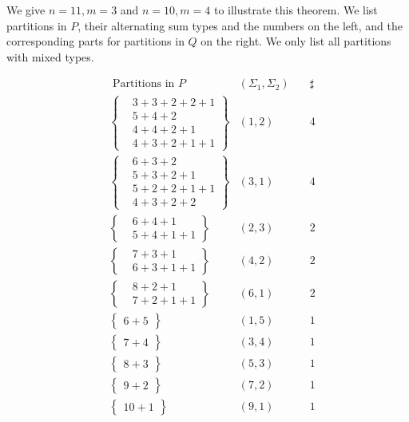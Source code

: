 \documentclass[11pt]{article}
\newtheorem{example}{\it Example\/}
\begin{document}
We give $n=11, m=3$ and $n=10, m=4$ to illustrate this theorem. 
We list partitions in $P$, their alternating sum types and the numbers on the left, and the corresponding parts for partitions in $Q$ on the right. We only list all partitions with mixed types.

\begin{minipage}{0.38\textwidth}
\small
\begin{align*}
& \mbox{ Partitions in $P$} &(\Sigma_{1}, \Sigma_{2})&\quad\sharp \\
&\left\{
\begin{array}{llll}
&3+3+2+2+1\\
&5+4+2\\
&4+4+2+1\\
&4+3+2+1+1
\end{array}
\right\} &(1, 2)   &\quad4 \\
&\left\{
\begin{array}{llll}
&6+3+2\\
&5+3+2+1\\
&5+2+2+1+1\\
&4+3+2+2
\end{array}
\right\} &(3,1)  &\quad4\\
&\left\{
\begin{array}{ll}
&6+4+1\\
&5+4+1+1
\end{array}
\right\} &(2,3)  &\quad2 \\
&\left\{
\begin{array}{ll}
&7+3+1\\
&6+3+1+1
\end{array}
\right\} &(4,2)  &\quad2\\
&\left\{
\begin{array}{ll}
&8+2+1\\
&7+2+1+1
\end{array}
\right\} &(6,1)  &\quad2\\
&\left\{
\begin{array}{l}
6+5
\end{array}
\right\} &(1,5)  &\quad1\\
&\left\{
\begin{array}{l}
7+4
\end{array}
\right\} &(3,4)  &\quad1\\
&\left\{
\begin{array}{l}
8+3
\end{array}
\right\} &(5,3)  &\quad1\\
&\left\{
\begin{array}{l}
9+2
\end{array}
\right\} &(7,2)  &\quad1\\
&\left\{
\begin{array}{l}
10+1
\end{array}
\right\} &(9,1)  &\quad1
 \end{align*}
\end{minipage}
\end{document}
